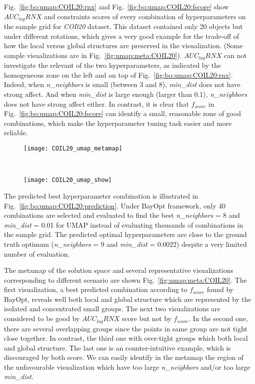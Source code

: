 Fig.~\ref{fig:bo:umap:COIL20:rnx} and Fig.~\ref{fig:bo:umap:COIL20:fscore} show $AUC_{log}RNX$ and constraints scores of every combination of hyperparameters on the sample grid for \emph{COIl20} dataset.
This dataset contained only 20 objects but under different rotations, which gives a very good example for the trade-off of how the local versus global structures are preserved in the visualization. (Some sample visualizations are in Fig.~\ref{fig:umap:meta:COIL20}).
$AUC_{log}RNX$ can not investigate the relevant of the two hyperparameters, as indicated by the homogeneous zone on the left and on top of Fig.~\ref{fig:bo:umap:COIL20:rnx}.
Indeed, when \emph{n\_neighbors} is small (between 3 and 8), \emph{min\_dist} does not have strong affect. And when \emph{min\_dist} is large enough (larger than 0.1), \emph{n\_neighbors} does not have strong affect either.
In contrast, it is clear that $f_{score}$ in Fig.~\ref{fig:bo:umap:COIL20:fscore} can identify a small, reasonable zone of good combinations, which make the hyperparameter tuning task easier and more reliable.

\begin{figure*}
    \centering
    \begin{subfigure}[b]{.95\linewidth}
        \centering
        \texttt{[image: COIL20\_umap\_metamap]}
    \end{subfigure}
    ~
    \begin{subfigure}[b]{.95\linewidth}
        \texttt{[image: COIL20\_umap\_show]}
    \end{subfigure}
    \caption{Metamaps and sample visualizations with selected hyperparameters for \emph{COIL20} dataset.}
    \label{fig:umap:meta:COIL20}
\end{figure*}

The predicted best hyperparameter combination is illustrated in Fig.~\ref{fig:bo:umap:COIL20:prediction}.
Under BayOpt framework, only 40 combinations are selected and evaluated to find the best \emph{n\_neighbors} = 8 and \emph{min\_dist} = 0.01 for UMAP instead of evaluating thousands of combinations in the sample grid.
The predicted optimal hyperparameters are close to the ground truth optimum (\emph{n\_neighbors} = 9 and \emph{min\_dist} = 0.0022) despite a very limited number of evaluation.

The metamap of the solution space and several representative visualizations corresponding to different scenario are shown Fig.~\ref{fig:umap:meta:COIL20}.
The first visualization, a best predicted combination according to $f_{score}$ found by BayOpt, reveals well both local and global structure which are represented by the isolated and concentrated small groups.
The next two visualizations are considered to be good by $AUC_{log}RNX$ score but not by $f_{score}$.
In the second one, there are several overlapping groups since the points in same group are not tight close together.
In contrast, the third one with over-tight groups which  both local and global structure.
The last one is an counter-intuitive example, which is discouraged by both score.
We can easily identify in the metamap the region of the unfavourable visualization which have too large \emph{n\_neighbors} and/or too large \emph{min\_dist}.

